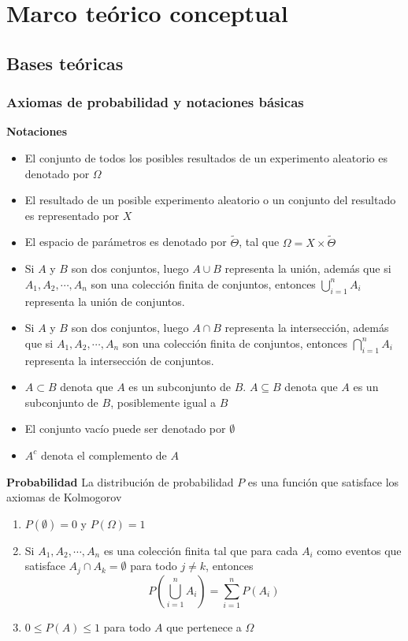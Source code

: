 \newpage
\section{Marco teórico conceptual}
\subsection{Bases teóricas}
\subsubsection{Axiomas de probabilidad y notaciones básicas}

\begin{defi}
    \textbf{Notaciones} \cite{koski2011bayesian}
    \begin{itemize}
        \item El conjunto de todos los posibles resultados de un experimento aleatorio es denotado por $\Omega$
        \item El resultado de un posible experimento aleatorio o un conjunto del resultado es representado por $X$
        \item El espacio de parámetros es denotado por $\tilde{\Theta}$, tal que $\Omega = X \times \tilde{\Theta}$
        \item Si $A$ y $B$ son dos conjuntos, luego $A \cup B$ representa la unión, además que si ${A}_{1},{A}_{2},\cdots,{A}_{n}$ son una colección finita de conjuntos, entonces $\bigcup_{i=1}^{n} {A}_{i}$ representa la unión de conjuntos.
        \item Si $A$ y $B$ son dos conjuntos, luego $A \cap B$ representa la intersección, además que si ${A}_{1},{A}_{2},\cdots,{A}_{n}$ son una colección finita de conjuntos, entonces $\bigcap_{i=1}^{n} {A}_{i}$ representa la intersección de conjuntos.
        \item $A \subset B$ denota que $A$ es un subconjunto de $B$. $A \subseteq B$ denota que $A$ es un subconjunto de $B$, posiblemente igual a $B$
        \item El conjunto vacío puede ser denotado por $\emptyset$
        \item ${A}^{c}$ denota el complemento de $A$ 
    \end{itemize}
\end{defi}

\begin{defi}
    \textbf{Probabilidad} \cite{koski2011bayesian}
    La distribución de probabilidad $P$ es una función que satisface los axiomas de Kolmogorov
    \begin{enumerate}
        \item $P(\emptyset) = 0$ y $P(\Omega) = 1$
        \item Si ${A}_{1},{A}_{2},\cdots,{A}_{n}$ es una colección finita tal que para cada $A_i$ como eventos que satisface ${A}_{j} \cap {A}_{k} = \emptyset$ para todo $j \neq k$, entonces
        $$P(\bigcup_{i=1}^{n} {A}_{i})=\sum\limits_{i = 1}^{n}P(A_i)$$ 
        \item $0 \leq P(A) \leq 1$ para todo $A$ que pertenece a $\Omega$
    \end{enumerate}
\end{defi}

